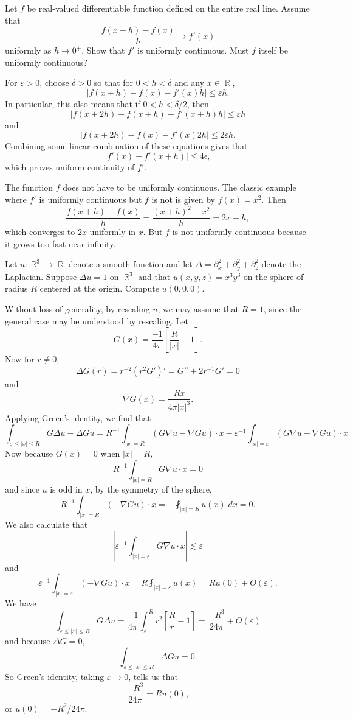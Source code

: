 \documentclass[answers]{exam}
\DeclareMathOperator{\RR}{\mathbb{R}}
\begin{document}
\begin{questions}
\newpage

\question Let $f$ be real-valued differentiable function defined on the entire real line. Assume that
%
\[ \frac{f(x+h) - f(x)}{h} \to f'(x) \]
%
uniformly as $h \to 0^+$. Show that $f'$ is uniformly continuous. Must $f$ itself be uniformly continuous?
\begin{solution}
	For $\varepsilon > 0$, choose $\delta > 0$ so that for $0 < h < \delta$ and any $x \in \RR$,
	\[ |f(x + h) - f(x) - f'(x) h| \leq \varepsilon h. \]
	In particular, this also means that if $0 < h < \delta / 2$, then
	\[ |f(x + 2h) - f(x + h) - f'(x + h) h| \leq \varepsilon h \]
	and
	\[ |f(x + 2h) - f(x) - f'(x) 2h| \leq 2 \varepsilon h. \]
	Combining some linear combination of these equations gives that
	\[ |f'(x) - f'(x + h)| \leq 4 \epsilon, \]
	which proves uniform continuity of $f'$.

	The function $f$ does not have to be uniformly continuous. The classic example where $f'$ is uniformly continuous but $f$ is not is given by $f(x) = x^2$. Then
	\[ \frac{f(x + h) - f(x)}{h} = \frac{(x + h)^2 - x^2}{h} = 2x + h, \]
	which converges to $2x$ uniformly in $x$. But $f$ is not uniformly continuous because it grows too fast near infinity.
\end{solution}

\question Let $u: \RR^3 \to \RR$ denote a smooth function and let $\Delta = \partial_x^2 + \partial_y^2 + \partial_z^2$ denote the Laplacian. Suppose $\Delta u = 1$ on $\RR^3$ and that $u(x,y,z) = x^3y^3$ on the sphere of radius $R$ centered at the origin. Compute $u(0,0,0)$.
\begin{solution}
	Without loss of generality, by rescaling $u$, we may assume that $R = 1$, since the general case may be understood by rescaling. Let
	\[ G(x) = \frac{-1}{4\pi} \left[ \frac{R}{|x|} - 1 \right]. \]
	Now for $r \neq 0$,
	\[ \Delta G(r) = r^{-2} (r^2 G')' = G'' + 2r^{-1} G' = 0 \]
	and
	\[ \nabla G(x) = \frac{R x}{4\pi |x|^3}. \]
	Applying Green's identity, we find that
	\[ \int_{\varepsilon \leq |x| \leq R} G \Delta u - \Delta G u = R^{-1} \int_{|x| = R} (G \nabla u - \nabla G u) \cdot x - \varepsilon^{-1} \int_{|x| = \varepsilon} ( G \nabla u - \nabla G u ) \cdot x \]
	Now because $G(x) = 0$ when $|x| = R$,
	\[ R^{-1} \int_{|x| = R} G \nabla u \cdot x = 0 \]
	and since $u$ is odd in $x$, by the symmetry of the sphere,
	\[ R^{-1} \int_{|x| = R} (- \nabla G u) \cdot x = - \fint_{|x| = R} u(x)\; dx = 0. \]
	We also calculate that
	\[ \left| \varepsilon^{-1} \int_{|x| = \varepsilon} G \nabla u \cdot x \right| \lesssim \varepsilon \]
	and
	\[ \varepsilon^{-1} \int_{|x| = \varepsilon} (- \nabla G u) \cdot x = R \fint_{|x| = \varepsilon} u(x) = R u(0) + O(\varepsilon). \]
	We have
	\[ \int_{\varepsilon \leq |x| \leq R} G \Delta u = \frac{-1}{4 \pi} \int_\varepsilon^R r^2 \left[ \frac{R}{r} - 1 \right] = \frac{-R^3}{24 \pi} + O(\varepsilon) \]
	and because $\Delta G = 0$,
	\[ \int_{\varepsilon \leq |x| \leq R} \Delta G u = 0. \]
	So Green's identity, taking $\varepsilon \to 0$, tells us that
	\[ \frac{-R^3}{24 \pi} = R u(0), \]
	or $u(0) = - R^2 / 24 \pi$.
\end{solution}


\end{questions}
\end{document}
